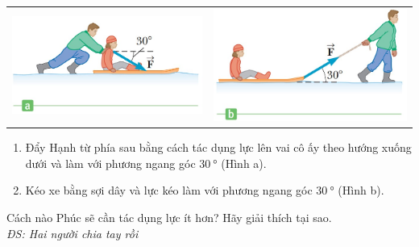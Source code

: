 \begin{tomtat}
\begin{vd}
\begin{center}
		\begin{tabular}{M{8cm}M{8cm}}
			\includegraphics[scale=0.6]{figs/BTMASAT-2}& \includegraphics[scale=0.6]{figs/BTMASAT-3}
		\end{tabular}
	\end{center}
	\begin{enumerate}[label=\bfseries Lựa chọn \arabic*:, leftmargin=2.75cm]
		\item Đẩy Hạnh từ phía sau bằng cách tác dụng lực lên vai cô ấy theo hướng xuống dưới và làm với phương ngang góc $\SI{30}{\degree}$ (Hình a).
		\item Kéo xe bằng sợi dây và lực kéo làm với phương ngang góc $\SI{30}{\degree}$ (Hình b).\\
	\end{enumerate}
Cách nào Phúc sẽ cần tác dụng lực ít hơn? Hãy giải thích tại sao.\\
\null\hfill\textit{ĐS: Hai người chia tay rồi \LARGE\Laughey}
\loigiai{}
\end{vd}
\begin{vd}
\end{vd}
\end{tomtat}

